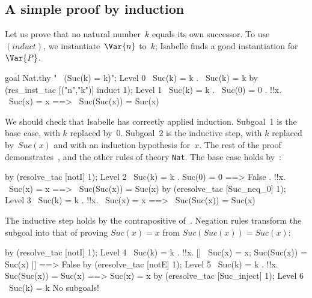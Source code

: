 \subsection{A simple proof by induction}
Let us prove that no natural number~$k$ equals its own successor.  To
use~$(induct)$, we instantiate~$\Var{n}$ to~$k$; Isabelle finds a good
instantiation for~$\Var{P}$.
\begin{ttbox}
goal Nat.thy "~ (Suc(k) = k)";
{\out Level 0}
{\out ~Suc(k) = k}
{. ~Suc(k) = k}
\ttbreak
by (res_inst_tac [("n","k")] induct 1);
{\out Level 1}
{\out ~Suc(k) = k}
{. ~Suc(0) = 0}
{. !!x. ~Suc(x) = x ==> ~Suc(Suc(x)) = Suc(x)}
\end{ttbox}
We should check that Isabelle has correctly applied induction.  Subgoal~1
is the base case, with $k$ replaced by~0.  Subgoal~2 is the inductive step,
with $k$ replaced by~$Suc(x)$ and with an induction hypothesis for~$x$.
The rest of the proof demonstrates~,  and the
other rules of theory {\tt Nat}.  The base case holds by~:
\begin{ttbox}
by (resolve_tac [notI] 1);
{\out Level 2}
{\out ~Suc(k) = k}
{. Suc(0) = 0 ==> False}
{. !!x. ~Suc(x) = x ==> ~Suc(Suc(x)) = Suc(x)}
\ttbreak
by (eresolve_tac [Suc_neq_0] 1);
{\out Level 3}
{\out ~Suc(k) = k}
{. !!x. ~Suc(x) = x ==> ~Suc(Suc(x)) = Suc(x)}
\end{ttbox}
The inductive step holds by the contrapositive of~.
Negation rules transform the subgoal into that of proving $Suc(x)=x$ from
$Suc(Suc(x)) = Suc(x)$:
\begin{ttbox}
by (resolve_tac [notI] 1);
{\out Level 4}
{\out ~Suc(k) = k}
{. !!x. [| ~Suc(x) = x; Suc(Suc(x)) = Suc(x) |] ==> False}
\ttbreak
by (eresolve_tac [notE] 1);
{\out Level 5}
{\out ~Suc(k) = k}
{. !!x. Suc(Suc(x)) = Suc(x) ==> Suc(x) = x}
\ttbreak
by (eresolve_tac [Suc_inject] 1);
{\out Level 6}
{\out ~Suc(k) = k}
{\out No subgoals!}
\end{ttbox}


